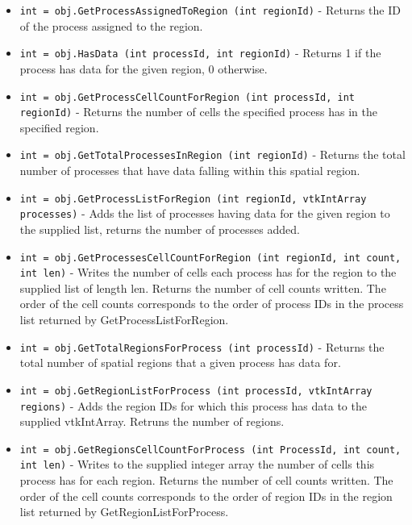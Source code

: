 \begin{itemize}
\item  \verb|int = obj.GetProcessAssignedToRegion (int regionId)| -     Returns the ID of the process assigned to the region.

\item  \verb|int = obj.HasData (int processId, int regionId)| -    Returns 1 if the process has data for the given region,
   0 otherwise. 

\item  \verb|int = obj.GetProcessCellCountForRegion (int processId, int regionId)| -    Returns the number of cells the specified process has in the
   specified region.  

\item  \verb|int = obj.GetTotalProcessesInRegion (int regionId)| -    Returns the total number of processes that have data
   falling within this spatial region. 

\item  \verb|int = obj.GetProcessListForRegion (int regionId, vtkIntArray processes)| -    Adds the list of processes having data for the given
   region to the supplied list, returns the number of
   processes added.

\item  \verb|int = obj.GetProcessesCellCountForRegion (int regionId, int count, int len)| -    Writes the number of cells each process has for the region
   to the supplied list of length len.  Returns the number of
   cell counts written.  The order of the cell counts corresponds
   to the order of process IDs in the process list returned by
   GetProcessListForRegion.

\item  \verb|int = obj.GetTotalRegionsForProcess (int processId)| -    Returns the total number of spatial regions that a given
   process has data for. 

\item  \verb|int = obj.GetRegionListForProcess (int processId, vtkIntArray regions)| -    Adds the region IDs for which this process has data to
   the supplied vtkIntArray.  Retruns the number of regions.

\item  \verb|int = obj.GetRegionsCellCountForProcess (int ProcessId, int count, int len)| -    Writes to the supplied integer array the number of cells this
   process has for each region.  Returns the number of
   cell counts written.  The order of the cell counts corresponds
   to the order of region IDs in the region list returned by
   GetRegionListForProcess.


\end{itemize}
